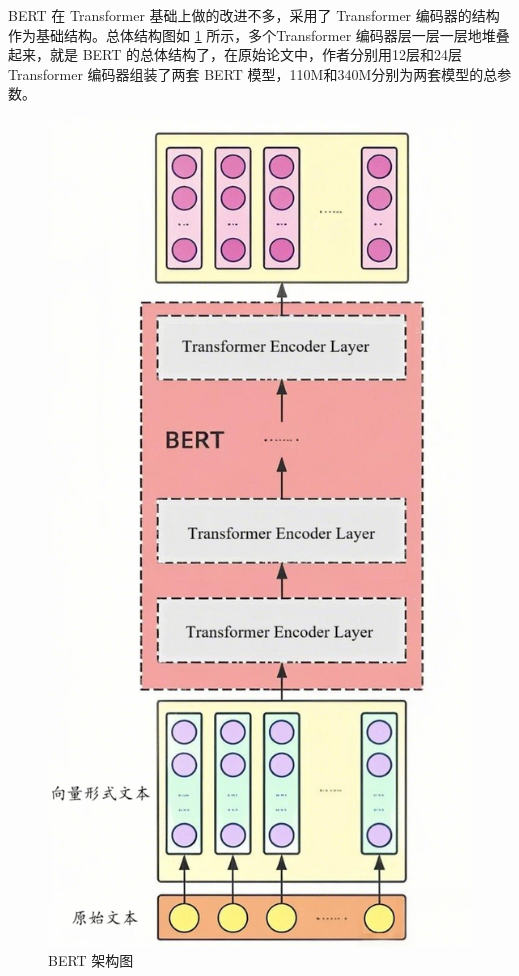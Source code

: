 BERT 在 Transformer 基础上做的改进不多，采用了 Transformer 编码器的结构作为基础结构。总体结构图如 \ref{fig:BERT} 所示，多个Transformer 编码器层一层一层地堆叠起来，就是 BERT 的总体结构了，在原始论文中，作者分别用12层和24层Transformer 编码器组装了两套 BERT 模型，110M和340M分别为两套模型的总参数。

\begin{figure}[htbp]
	\centering
	\includegraphics[scale = 0.7]{figures/bert.png}
	\caption{BERT 架构图}
	\label{fig:BERT}
\end{figure}

